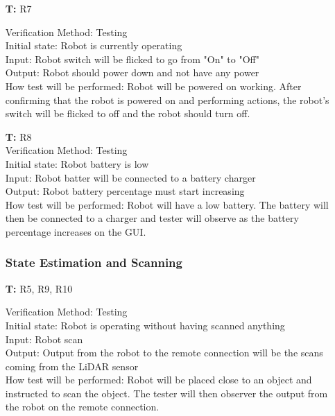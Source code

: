 \documentclass[12pt, titlepage]{article}
\newcounter{tnum} %
\begin{document}
\begin{itemize}
\item[\textbf{T\refstepcounter{tnum}\thetnum:}]{R7\\}

Verification Method: Testing\\
Initial state: Robot is currently operating \\
Input: Robot switch will be flicked to go from "On" to "Off"\\
Output: Robot should power down and not have any power \\
How test will be performed: Robot will be powered on working. After confirming that the robot is powered on and performing actions, the robot's switch will be flicked to off and the robot should turn off. \\

\item[\textbf{T\refstepcounter{tnum}\thetnum:}]{R8\\}
Verification Method: Testing\\
Initial state: Robot battery is low \\
Input: Robot batter will be connected to a battery charger \\
Output: Robot battery percentage must start increasing \\
How test will be performed: Robot will have a low battery. The battery will then be connected to a charger and tester will observe as the battery percentage increases on the GUI.\\

\subsubsection{State Estimation and Scanning}

\item[\textbf{T\refstepcounter{tnum}\thetnum:}]{R5, R9, R10\\}

Verification Method: Testing\\
Initial state: Robot is operating without having scanned anything \\
Input: Robot scan\\
Output: Output from the robot to the remote connection will be the scans coming from the LiDAR sensor\\
How test will be performed: Robot will be placed close to an object and instructed to scan the object. The tester will then observer the output from the robot on the remote connection. \\


\end{itemize}
\end{document}
